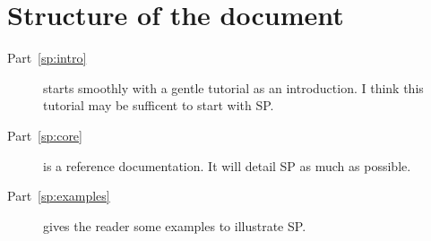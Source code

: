 \section{Structure of the document}

\begin{description}
\item [Part~\ref{sp:intro}]
starts smoothly with a gentle tutorial as an introduction.
I think this tutorial may be sufficent to start with SP.
\item [Part~\ref{sp:core}]
is a reference documentation. It will detail SP as much as possible.
\item [Part~\ref{sp:examples}]
gives the reader some examples to illustrate SP.
\end{description}
